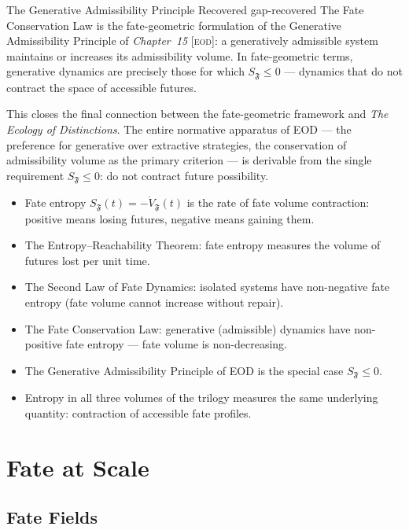 \documentclass[12pt,twoside,openright]{book}
\newcommand{\fateMap}{\mathfrak{F}}
\newcommand{\EOD}[1]{\textit{#1} [\textsc{eod}]}
\newenvironment{chapsummary}{%
  \begin{tcolorbox}[colback=DistBlue!5,colframe=DistBlue,
    title={\faBookOpen\enspace Summary},
    fonttitle=\sffamily\bfseries\color{white},
    attach boxed title to top left={yshift=-2mm,xshift=4mm},
    boxed title style={colback=DistBlue,rounded corners}]
  \begin{itemize}[nosep,leftmargin=*]}{%
  \end{itemize}\end{tcolorbox}}
\providecommand{\fateEnt}{S_{\fateMap}}
\begin{document}
\begin{remark}{The Generative Admissibility Principle Recovered}%
  {gap-recovered}
The Fate Conservation Law is the fate-geometric formulation of
the Generative Admissibility Principle of \EOD{Chapter~15}:
a generatively admissible system maintains or increases its
admissibility volume. In fate-geometric terms, generative
dynamics are precisely those for which $\fateEnt\le 0$ ---
dynamics that do not contract the space of accessible futures.

This closes the final connection between the fate-geometric
framework and \textit{The Ecology of Distinctions}. The entire
normative apparatus of EOD --- the preference for generative
over extractive strategies, the conservation of admissibility
volume as the primary criterion --- is derivable from the
single requirement $\fateEnt\le 0$: do not contract future
possibility.
\end{remark}

\begin{chapsummary}
\item Fate entropy $\fateEnt(t)=-\dot{V}_\fateMap(t)$ is the
  rate of fate volume contraction: positive means losing
  futures, negative means gaining them.
\item The Entropy--Reachability Theorem: fate entropy measures
  the volume of futures lost per unit time.
\item The Second Law of Fate Dynamics: isolated systems have
  non-negative fate entropy (fate volume cannot increase
  without repair).
\item The Fate Conservation Law: generative (admissible) dynamics
  have non-positive fate entropy --- fate volume is
  non-decreasing.
\item The Generative Admissibility Principle of EOD is the
  special case $\fateEnt\le 0$.
\item Entropy in all three volumes of the trilogy measures
  the same underlying quantity: contraction of accessible
  fate profiles.
\end{chapsummary}

\part{Fate at Scale}



\chapter{Fate Fields}
\label{ch:fate-fields}
\end{document}
